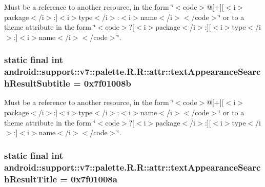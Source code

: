 Must be a reference to another resource, in the form \char`\"{}$<$code$>$@\mbox{[}+\mbox{]}\mbox{[}$<$i$>$package$<$/i$>$:\mbox{]}$<$i$>$type$<$/i$>$:$<$i$>$name$<$/i$>$$<$/code$>$\char`\"{} or to a theme attribute in the form \char`\"{}$<$code$>$?\mbox{[}$<$i$>$package$<$/i$>$:\mbox{]}\mbox{[}$<$i$>$type$<$/i$>$:\mbox{]}$<$i$>$name$<$/i$>$$<$/code$>$\char`\"{}. \hypertarget{classandroid_1_1support_1_1v7_1_1palette_1_1_r_1_1attr_28543e8a8815f1450bc5f3118786a417}{
\subsubsection[{textAppearanceSearchResultSubtitle}]{\setlength{\rightskip}{0pt plus 5cm}static final int android::support::v7::palette.R.R::attr::textAppearanceSearchResultSubtitle = 0x7f01008b}}
\label{classandroid_1_1support_1_1v7_1_1palette_1_1_r_1_1attr_28543e8a8815f1450bc5f3118786a417}


Must be a reference to another resource, in the form \char`\"{}$<$code$>$@\mbox{[}+\mbox{]}\mbox{[}$<$i$>$package$<$/i$>$:\mbox{]}$<$i$>$type$<$/i$>$:$<$i$>$name$<$/i$>$$<$/code$>$\char`\"{} or to a theme attribute in the form \char`\"{}$<$code$>$?\mbox{[}$<$i$>$package$<$/i$>$:\mbox{]}\mbox{[}$<$i$>$type$<$/i$>$:\mbox{]}$<$i$>$name$<$/i$>$$<$/code$>$\char`\"{}. \hypertarget{classandroid_1_1support_1_1v7_1_1palette_1_1_r_1_1attr_46088c84c7ecc3871d3207e7e556fde0}{
\subsubsection[{textAppearanceSearchResultTitle}]{\setlength{\rightskip}{0pt plus 5cm}static final int android::support::v7::palette.R.R::attr::textAppearanceSearchResultTitle = 0x7f01008a}}
\label{classandroid_1_1support_1_1v7_1_1palette_1_1_r_1_1attr_46088c84c7ecc3871d3207e7e556fde0}


